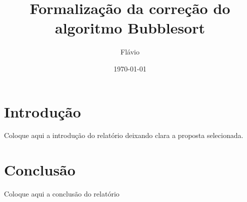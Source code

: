 \documentclass{article}
\title{Formalização da correção do algoritmo Bubblesort}
\author{Flávio}
\date{\today}
\begin{document}
\maketitle

\section{Introdução}

Coloque aqui a introdução do relatório deixando clara a proposta selecionada.



\section{Conclusão}

Coloque aqui a conclusão do relatório
\end{document}
